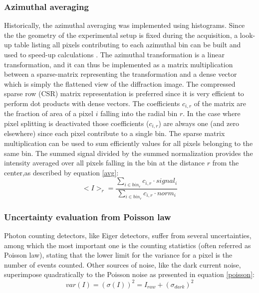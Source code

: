 \documentclass[preprint]{iucr}              %
\begin{document}
\subsubsection{Azimuthal averaging} 
Historically, the azimuthal averaging was implemented using histograms. Since the the geometry of the experimental setup is fixed during the acquisition, a look-up table listing all pixels contributing to each  azimuthal bin can be built and used to speed-up calculations \cite{pyFAI_gpu}.
The azimuthal transformation is a linear transformation, and it can thus be implemented as a  matrix multiplication between a sparse-matrix representing the transformation and a dense vector which is simply the flattened view of the diffraction image. 
The compressed sparse row (CSR) matrix representation is preferred since it is very efficient to perform dot products with dense vectors.
The coefficients $c_{i,r}$ of the matrix are the fraction of area of a pixel $i$ falling into the radial bin $r$.
In the case where pixel splitting is deactivated those coefficients  ($c_{i,r}$) are always one (and zero elsewhere) since each pixel contribute to a single bin.
The sparse matrix multiplication can be used to sum efficiently values for all pixels belonging to the same bin.
The summed signal divided by the summed normalization provides the intensity averaged over all pixels falling in the bin at the distance $r$ from the center,as described by equation \ref{avg}: 
\begin{equation}
\label{avg}
<I>_{r} = \frac{\sum\limits_{i \in bin_r} c_{i,r} \cdot signal_i}
                        {\sum\limits_{i \in bin_r} c_{i,r} \cdot norm_i} 
\end{equation}  

\subsubsection{Uncertainty evaluation from Poisson law}
Photon counting detectors, like Eiger detectors, suffer from several uncertainties, among which the most important one is the counting statistics (often referred as Poisson law),
stating that the lower limit for the variance for a pixel is the number of events counted.
Other sources of noise, like the dark current noise,  superimpose quadratically to the Poisson noise as presented in equation \ref{poisson}:     
\begin{equation}
\label{poisson}
var(I) = (\sigma(I))^{2} = I_{raw} + (\sigma_{dark})^{2}  
\end{equation}
\end{document}
